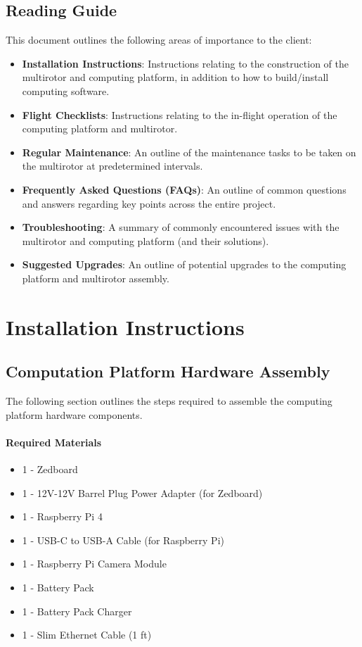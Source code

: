 \documentclass[10pt,letterpaper]{article}
\begin{document}
\subsection{Reading Guide}
This document outlines the following areas of importance to the client: 
\begin{itemize}
\item \textbf{Installation Instructions}: Instructions relating to the construction of the multirotor and computing platform, in addition to how to build/install computing software.
\item \textbf{Flight Checklists}: Instructions relating to the in-flight operation of the computing platform and multirotor.
\item \textbf{Regular Maintenance}: An outline of the maintenance tasks to be taken on the multirotor at predetermined intervals.
\item \textbf{Frequently Asked Questions (FAQs)}: An outline of common questions and answers regarding key points across the entire project.
\item \textbf{Troubleshooting}: A summary of commonly encountered issues with the multirotor and computing platform (and their solutions).
\item \textbf{Suggested Upgrades}: An outline of potential upgrades to the computing platform and multirotor assembly.
\end{itemize}

\clearpage
\section{Installation Instructions}

\subsection{Computation Platform Hardware Assembly}
The following section outlines the steps required to assemble the computing platform hardware components.

\paragraph{Required Materials}
\begin{itemize}
\item 1 - Zedboard
\item 1 - 12V-12V Barrel Plug Power Adapter (for Zedboard)
\item 1 - Raspberry Pi 4
\item 1 - USB-C to USB-A Cable (for Raspberry Pi)
\item 1 - Raspberry Pi Camera Module
\item 1 - Battery Pack
\item 1 - Battery Pack Charger
\item 1 - Slim Ethernet Cable (1 ft)
\end{itemize}
\end{document}
